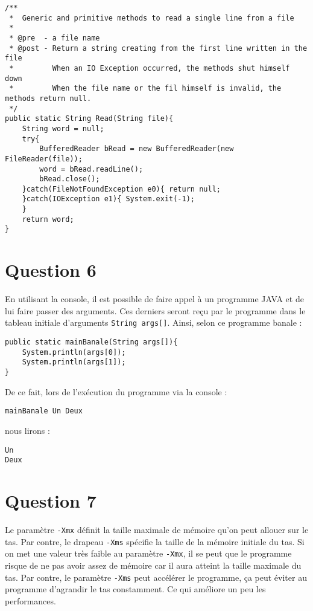 \documentclass[a4paper,10pt]{article}
\begin{document}
\begin{lstlisting}
/**
 *  Generic and primitive methods to read a single line from a file
 * 
 * @pre  - a file name
 * @post - Return a string creating from the first line written in the file
 *         When an IO Exception occurred, the methods shut himself down
 *         When the file name or the fil himself is invalid, the methods return null.
 */
public static String Read(String file){
    String word = null;
    try{
        BufferedReader bRead = new BufferedReader(new FileReader(file));
        word = bRead.readLine();
        bRead.close();
    }catch(FileNotFoundException e0){ return null; 
    }catch(IOException e1){ System.exit(-1);
    }
    return word;
}
\end{lstlisting}

\section*{Question 6}

En utilisant la console, il est possible de faire appel à un programme JAVA et de lui faire passer des arguments. Ces derniers seront reçu par le programme dans le tableau initiale d'arguments \texttt{String args[]}. Ainsi, selon ce programme banale :

\begin{lstlisting}
public static mainBanale(String args[]){
    System.println(args[0]);
    System.println(args[1]);
}
\end{lstlisting}

De ce fait, lors de l'exécution du programme via la console :
\begin{lstlisting}
mainBanale Un Deux
\end{lstlisting}
nous lirons :
\begin{lstlisting}
Un
Deux
\end{lstlisting}

\section*{Question 7}

Le paramètre \texttt{-Xmx} définit la taille maximale de mémoire qu'on peut allouer sur le tas.
Par contre, le drapeau \texttt{-Xms} spécifie la taille de la mémoire initiale du tas.
Si on met une valeur très faible au paramètre \texttt{-Xmx}, il se peut que le programme risque de ne pas avoir assez de mémoire car il aura atteint la taille maximale du tas.
Par contre, le paramètre \texttt{-Xms} peut accélérer le programme, ça peut éviter au programme d'agrandir le tas constamment. Ce qui améliore un peu les performances.
\end{document}
